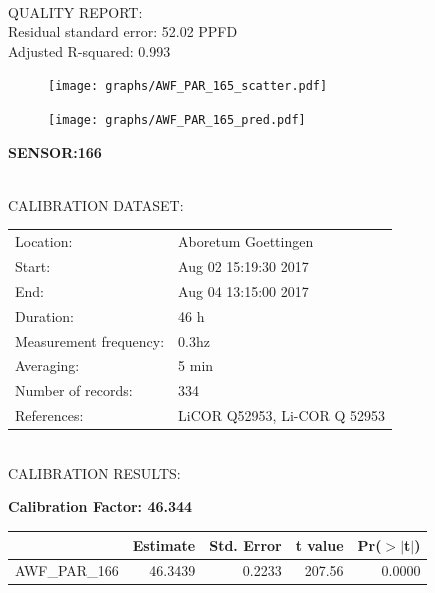 \documentclass[oneside]{report}
\begin{document}
\hrulefill\\
QUALITY REPORT:\\
Residual standard error: 52.02 PPFD\\
Adjusted R-squared: 0.993



\begin{figure}[H]
  \centering
  \texttt{[image: graphs/AWF\_PAR\_165\_scatter.pdf]}
\end{figure}




\begin{figure}[H]
  \centering
  \texttt{[image: graphs/AWF\_PAR\_165\_pred.pdf]}
\end{figure}

\pagebreak


\begin{center}
\large{\textbf{SENSOR:166}}\\
\end{center}

\hrulefill\\
CALIBRATION DATASET:\\
\begin{table}[h!]
  \centering
  \label{tab:table1}
  \begin{tabular}{ll}
    Location: & Aboretum Goettingen\\ 
    
    
    Start:  & Aug 02 15:19:30 2017 \\
    End:   & Aug 04 13:15:00 2017\\ 
    Duration: & 46 h\\
    Measurement frequency: & 0.3hz\\
    Averaging:  &5 min\\
    Number of records: & 334 \\
    References: & LiCOR Q52953, Li-COR Q 52953 \\
  \end{tabular}
\end{table}

\hrulefill\\
CALIBRATION RESULTS:\\


\begin{center}
\textbf{\large{Calibration Factor: 46.344}}\\
\end{center}
\begin{table}[ht]
\centering
\begin{tabular}{rrrrr}
  \hline
 & Estimate & Std. Error & t value & Pr($>$$|$t$|$) \\ 
  \hline
AWF\_PAR\_166 & 46.3439 & 0.2233 & 207.56 & 0.0000 \\ 
   \hline
\end{tabular}
\end{table}
\end{document}
